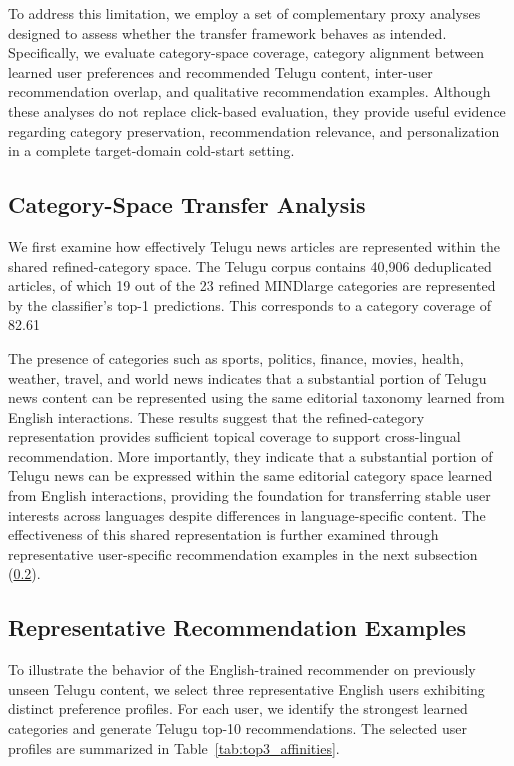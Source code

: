 \documentclass[conference]{IEEEtran}
\begin{document}
To address this limitation, we employ a set of complementary proxy analyses designed to assess whether the transfer framework behaves as intended. Specifically, we evaluate category-space coverage, category alignment between learned user preferences and recommended Telugu content, inter-user recommendation overlap, and qualitative recommendation examples. Although these analyses do not replace click-based evaluation, they provide useful evidence regarding category preservation, recommendation relevance, and personalization in a complete target-domain cold-start setting.

\subsection{Category-Space Transfer Analysis}

We first examine how effectively Telugu news articles are represented within the shared refined-category space. The Telugu corpus contains 40,906 deduplicated articles, of which 19 out of the 23 refined MINDlarge categories are represented by the classifier's top-1 predictions. This corresponds to a category coverage of 82.61%

The presence of categories such as sports, politics, finance, movies, health, weather, travel, and world news indicates that a substantial portion of Telugu news content can be represented using the same editorial taxonomy learned from English interactions. These results suggest that the refined-category representation provides sufficient topical coverage to support cross-lingual recommendation. More importantly, they indicate that a substantial portion of Telugu news can be expressed within the same editorial category space learned from English interactions, providing the foundation for transferring stable user interests across languages despite differences in language-specific content.
 The effectiveness of this shared representation is further examined through representative user-specific recommendation examples in the next subsection (\ref{repre}).

\subsection{Representative Recommendation Examples}\label{repre}

To illustrate the behavior of the English-trained recommender on previously unseen Telugu content, we select three representative English users exhibiting distinct preference profiles. For each user, we identify the strongest learned categories and generate Telugu top-10 recommendations. The selected user profiles are summarized in Table~\ref{tab:top3_affinities}.
\end{document}
